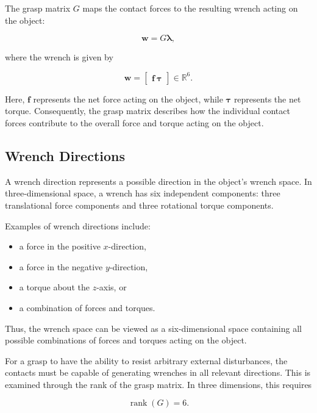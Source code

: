 The grasp matrix $G$ maps the contact forces to the resulting wrench acting on the object:

\begin{equation}
\mathbf{w} = G\boldsymbol{\lambda},
\end{equation}

where the wrench is given by

\begin{equation}
\mathbf{w}
=
\begin{bmatrix}
\mathbf{f} \
\boldsymbol{\tau}
\end{bmatrix}
\in \mathbb{R}^{6}.
\end{equation}

Here, $\mathbf{f}$ represents the net force acting on the object, while $\boldsymbol{\tau}$ represents the net torque. Consequently, the grasp matrix describes how the individual contact forces contribute to the overall force and torque acting on the object.

\subsection{Wrench Directions}

A wrench direction represents a possible direction in the object's wrench space. In three-dimensional space, a wrench has six independent components: three translational force components and three rotational torque components.

Examples of wrench directions include:

\begin{itemize}
\item a force in the positive $x$-direction,
\item a force in the negative $y$-direction,
\item a torque about the $z$-axis, or
\item a combination of forces and torques.
\end{itemize}

Thus, the wrench space can be viewed as a six-dimensional space containing all possible combinations of forces and torques acting on the object.

For a grasp to have the ability to resist arbitrary external disturbances, the contacts must be capable of generating wrenches in all relevant directions. This is examined through the rank of the grasp matrix. In three dimensions, this requires

\begin{equation}
\operatorname{rank}(G) = 6.
\end{equation}

